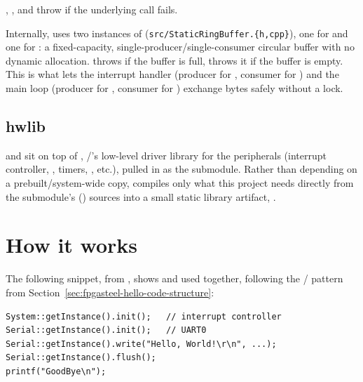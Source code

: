, ,  and  throw  if the underlying  call fails.

Internally,  uses two instances of  (\lstinline[style=inlineFsRepo]!src/StaticRingBuffer.{h,cpp}!), one for  and one for : a fixed-capacity, single-producer/single-consumer circular buffer with no dynamic allocation.  throws  if the buffer is full,  throws it if the buffer is empty. This is what lets the  interrupt handler (producer for , consumer for ) and the main loop (producer for , consumer for ) exchange bytes safely without a lock.

\subsection{hwlib}
\label{subsec:fpgasteel-hello-hwlib}

 and  sit on top of , /'s low-level driver library for the  peripherals (interrupt controller, , timers, , etc.), pulled in as the   submodule. Rather than depending on a prebuilt/system-wide copy,  compiles only what this project needs directly from the submodule's  () sources into a small static library artifact, .

\section{How it works}
\label{sec:fpgasteel-hello-how-it-works}

The following snippet, from , shows  and  used together, following the / pattern from Section~\ref{sec:fpgasteel-hello-code-structure}:

\begin{lstlisting}
System::getInstance().init();   // interrupt controller
Serial::getInstance().init();   // UART0
Serial::getInstance().write("Hello, World!\r\n", ...);
Serial::getInstance().flush();
printf("GoodBye\n");
\end{lstlisting}

